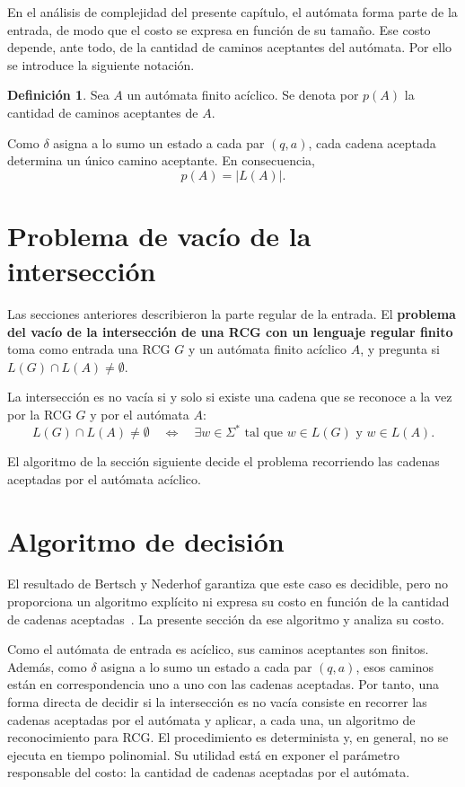 \documentclass{report}
\theoremstyle{definition}
\newtheorem{definicion}{Definición}[chapter]
\theoremstyle{plain}
\theoremstyle{remark}
\begin{document}
En el análisis de complejidad del presente capítulo, el autómata forma
parte de la entrada, de modo que el costo se expresa en función de su
tamaño. Ese costo depende, ante todo, de la cantidad de caminos
aceptantes del autómata. Por ello se introduce la siguiente notación.

\begin{definicion}
Sea $A$ un autómata finito acíclico. Se denota por $p(A)$ la cantidad
de caminos aceptantes de $A$.
\end{definicion}

Como $\delta$ asigna a lo sumo un estado a cada par $(q,a)$, cada
cadena aceptada determina un único camino aceptante. En consecuencia,
\[
  p(A)=|L(A)|.
\]

\section{Problema de vacío de la intersección}
\label{sec:problema-vacio-interseccion}

Las secciones anteriores describieron la parte regular de la entrada. El
\textbf{problema del vacío de la intersección de una RCG con un lenguaje
regular finito} toma como entrada una RCG $G$ y un autómata
finito acíclico $A$, y pregunta si $L(G) \cap L(A) \neq \emptyset$.

La intersección es no vacía si y solo si existe una cadena que se
reconoce a la vez por la RCG $G$ y por el autómata $A$:
\[
  L(G) \cap L(A) \neq \emptyset
  \quad \Longleftrightarrow \quad
  \exists w \in \Sigma^* \text{ tal que } w \in L(G) \text{ y } w \in L(A).
\]

El algoritmo de la sección siguiente decide el problema recorriendo las
cadenas aceptadas por el autómata acíclico.

\section{Algoritmo de decisión}
\label{sec:algoritmo-decision}

El resultado de Bertsch y Nederhof garantiza que este caso es decidible,
pero no proporciona un algoritmo explícito ni expresa su costo en función
de la cantidad de cadenas aceptadas~\cite{bertsch2001rcg}. La presente
sección da ese algoritmo y analiza su costo.

Como el autómata de entrada es acíclico, sus caminos aceptantes son
finitos. Además, como $\delta$ asigna a lo sumo un estado a cada par
$(q,a)$, esos caminos están en correspondencia uno a uno con las
cadenas aceptadas. Por tanto, una
forma directa de decidir si la intersección es no vacía consiste en
recorrer las cadenas aceptadas por el autómata y aplicar, a cada una, un
algoritmo de reconocimiento para RCG. El procedimiento es
determinista y, en general, no se ejecuta en tiempo polinomial. Su utilidad está en
exponer el parámetro responsable del costo: la cantidad de cadenas
aceptadas por el autómata.
\end{document}
